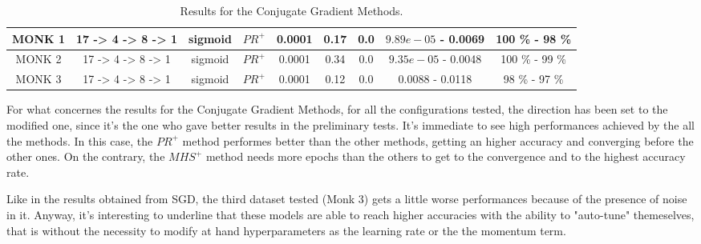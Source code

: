 \begin{table}[H]
\begin{subtable}{\textwidth}
{\begin{tabular}{| c | c | c | c | c | c | c | c | c |}
                            \hline
                            MONK 1 & 17 -> 4 -> 8 -> 1 & sigmoid & $PR^{+}$ & 0.0001 &  0.17 & 0.0
                            & $9.89e-05$ - 0.0069 & 100 \% - 98 \% \\
                            \hline
                            MONK 2 & 17 -> 4 -> 8 -> 1 & sigmoid & $PR^{+}$ & 0.0001 & 0.34 & 0.0
                            & $9.35e-05$ - 0.0048 & 100 \% - 99 \% \\
                            \hline
                            MONK 3 & 17 -> 4 -> 8 -> 1 & sigmoid & $PR^{+}$ & 0.0001 & 0.12 & 0.0
                            & 0.0088 - 0.0118 & 98 \% - 97 \% \\
                            \hline
                        \end{tabular}
                    }
                \end{subtable}
                \caption{Results for the Conjugate Gradient Methods.}
                \label{tab:monks_cgd}
        \end{table}

        For what concernes the results for the Conjugate Gradient Methods, for all the configurations tested,
        the direction has been set to the modified one, since it's the one who gave better results in the
        preliminary tests. It's immediate to see high performances achieved by the all the methods. In this case, the $PR^+$ method performes better than the other methods, getting an higher accuracy and converging before the other ones. On the contrary, the $MHS^+$ method needs more epochs than the others to get to the convergence and to the highest accuracy rate.

        Like in the results obtained from SGD, the third
        dataset tested (Monk 3) gets a little worse performances because of the presence of noise in it.
        Anyway, it's interesting to underline that these models are able to reach higher accuracies with the
        ability to "auto-tune" themeselves, that is without the necessity to modify at hand hyperparameters as the
        learning rate or the the momentum term.

